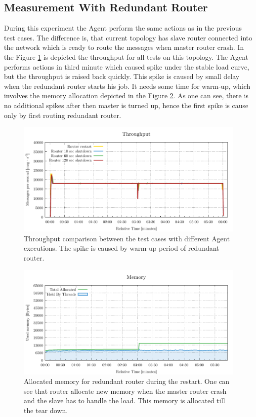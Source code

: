 \subsection{Measurement With Redundant Router}
During this experiment the Agent perform the same actions as in the previous test cases. The difference is, that current topology has slave router connected into the network which is ready to route the messages when master router crash. In the Figure \ref{fig:agent-redundant-throughput} is depicted the throughput for all tests on this topology. The Agent performs actions in third minute which caused spike under the stable load curve, but the throughput is raised back quickly. This spike is caused by small delay when the redundant router starts his job. It needs some time for warm-up, which involves the memory allocation depicted in the Figure \ref{fig:agent-redundant-memory}. As one can see, there is no additional spikes after then master is turned up, hence the first spike is cause only by first routing redundant router.

\begin{figure}[H]
	\centering
	\includegraphics[width=1\linewidth]{obrazky-figures/charts/agent-redundant-throughput.pdf}
	\caption{Throughput comparison between the test cases with different Agent executions. The spike is caused by warm-up period of redundant router.}
	\label{fig:agent-redundant-throughput}
\end{figure}

\begin{figure}[H]
	\centering
	\includegraphics[width=1\linewidth]{obrazky-figures/charts/restart-redundant-agent-memory.pdf}
	\caption{Allocated memory for redundant router during the restart. One can see that router allocate new memory when the master router crash and the slave has to handle the load. This memory is allocated till the tear down.}
	\label{fig:agent-redundant-memory}
\end{figure}


